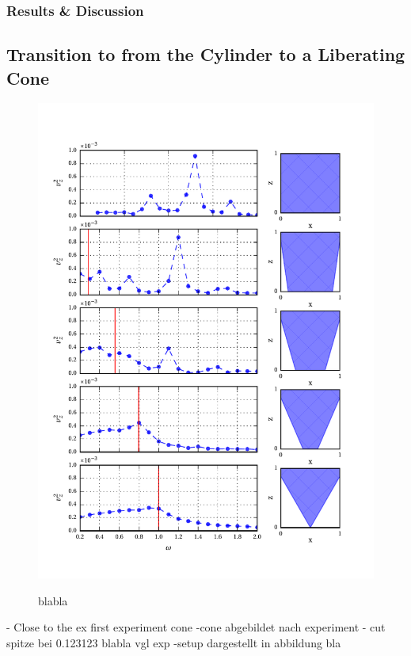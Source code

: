 \clearpage


\subsubsection{Results \& Discussion}


\clearpage

\subsection{Transition to from the Cylinder to a Liberating Cone}

\begin{figure}[!pt]
  \centering
  \includegraphics{gfx/cone/transition/transition.pdf}\label{fig:cone:transition}
  \caption{blabla}
\end{figure}


 - Close to the ex
first experiment cone
-cone abgebildet nach experiment
- cut spitze bei 0.123123 blabla vgl exp
-setup dargestellt in abbildung bla

